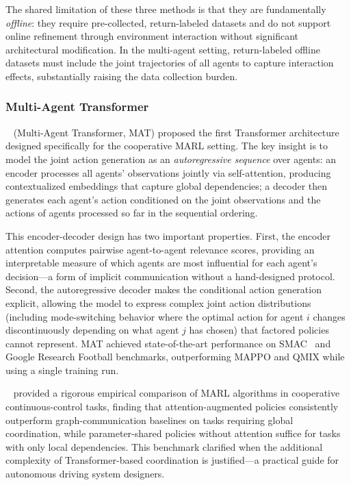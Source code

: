 \documentclass[12pt, a4paper]{article}
\begin{document}
The shared limitation of these three methods is that they are fundamentally
\emph{offline}: they require pre-collected, return-labeled datasets and do
not support online refinement through environment interaction without
significant architectural modification.  In the multi-agent setting,
return-labeled offline datasets must include the joint trajectories of all
agents to capture interaction effects, substantially raising the data
collection burden.

\subsubsection{Multi-Agent Transformer}

\citeauthor{wen2022multi}~\cite{wen2022multi} (Multi-Agent Transformer, MAT)
proposed the first Transformer architecture designed specifically for the
cooperative MARL setting.  The key insight is to model the joint action
generation as an \emph{autoregressive sequence} over agents: an encoder
processes all agents' observations jointly via self-attention, producing
contextualized embeddings that capture global dependencies; a decoder then
generates each agent's action conditioned on the joint observations and
the actions of agents processed so far in the sequential ordering.

This encoder-decoder design has two important properties.  First, the encoder
attention computes pairwise agent-to-agent relevance scores, providing an
interpretable measure of which agents are most influential for each agent's
decision---a form of implicit communication without a hand-designed protocol.
Second, the autoregressive decoder makes the conditional action
generation explicit, allowing the model to express complex joint action
distributions (including mode-switching behavior where the optimal action for
agent $i$ changes discontinuously depending on what agent $j$ has chosen)
that factored policies cannot represent.  MAT achieved state-of-the-art
performance on SMAC~\cite{samvelyan2019starcraft} and Google Research Football
benchmarks, outperforming MAPPO and QMIX while using a single training run.

\citeauthor{papoudakis2021benchmarking}~\cite{papoudakis2021benchmarking}
provided a rigorous empirical comparison of MARL algorithms in cooperative
continuous-control tasks, finding that attention-augmented policies
consistently outperform graph-communication baselines on tasks requiring
global coordination, while parameter-shared policies without attention
suffice for tasks with only local dependencies.  This benchmark clarified
when the additional complexity of Transformer-based coordination is
justified---a practical guide for autonomous driving system designers.
\end{document}
